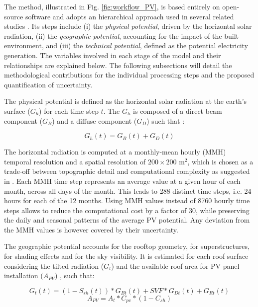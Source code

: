 The method, illustrated in Fig. \ref{fig:workflow_PV}, is based entirely on open-source software and adopts an hierarchical approach used in several related studies \cite{izquierdo_method_2008, ramirez_camargo_spatio-temporal_2015, assouline_quantifying_2017}. Its steps include 
(i) the \textit{physical potential}, driven by the horizontal solar radiation, 
(ii) the \textit{geographic potential}, accounting for the impact of the built environment, and
(iii) the \textit{technical potential}, defined as the potential electricity generation.
The variables involved in each stage of the model and their relationships are explained below. The following subsections will detail the methodological contributions for the individual processing steps and the proposed quantification of uncertainty.

The physical potential is defined as the horizontal solar radiation at the earth's surface ($G_h$) for each time step $t$. The $G_h$ is composed of a direct beam component ($G_B$) and a diffuse component ($G_D$) such that \cite{loutzenhiser_empirical_2007}:

\begin{equation}
\label{eq:Gh}
G_{h}(t) = G_{B}(t) + G_{D}(t)
\end{equation}

The horizontal radiation is computed at a monthly-mean hourly (MMH) temporal resolution and a spatial resolution of $200 \times 200$ m$^2$, 
which is chosen as a trade-off between topographic detail and computational complexity as suggested in \cite{izquierdo_method_2008, assouline_large-scale_2018}. 
Each MMH time step represents an average value at a given hour of each month, across all days of the month. This leads to 288 distinct time steps, i.e. 24 hours for each of the 12 months. 
Using MMH values instead of 8760 hourly time steps allows to reduce the computational cost by a factor of 30, while preserving the daily and seasonal patterns of the average PV potential.
Any deviation from the MMH values is however covered by their uncertainty.

The geographic potential accounts for the rooftop geometry, for superstructures, for shading effects and for the sky visibility. It is estimated for each roof surface considering the tilted radiation ($G_t$) and the available roof area for PV panel installation ($A_{PV}$)  \cite{assouline_large-scale_2018}, such that:

\begin{equation}
\label{eq:irrad}
G_{t}(t) = (1-S_{sh}(t)) * G_{Bt}(t) + \mathit{SVF} * G_{Dt}(t) + G_{Rt}(t)
\end{equation}
\begin{equation}
\label{eq:area}
A_{PV} = A_{t} * C_{\mathit{pv}} * (1 - C_{sh})
\end{equation}

